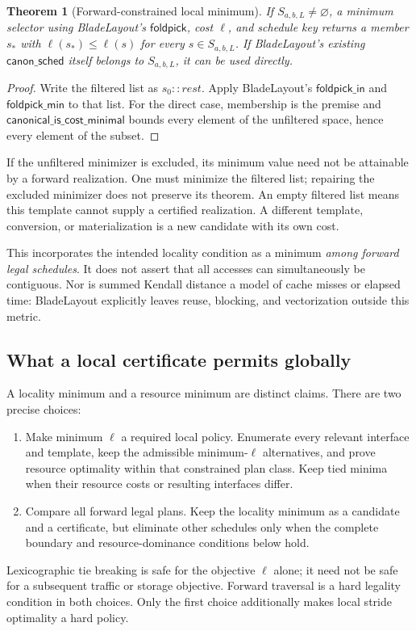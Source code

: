 \documentclass[11pt]{article}
\newtheorem{theorem}{Theorem}
\begin{document}
\begin{theorem}[Forward-constrained local minimum]
If $S_{a,b,L}\ne\varnothing$, a minimum selector using BladeLayout's
$\mathsf{foldpick}$, cost $\ell$, and schedule key returns a member $s_*$ with
$\ell(s_*)\le\ell(s)$ for every $s\in S_{a,b,L}$.
If BladeLayout's existing $\mathsf{canon\_sched}$ itself belongs to $S_{a,b,L}$, it can be used directly.
\end{theorem}
\begin{proof}
Write the filtered list as $s_0::\mathit{rest}$. Apply BladeLayout's
$\mathsf{foldpick\_in}$ and $\mathsf{foldpick\_min}$ to that list. For the direct case, membership is the premise and
$\mathsf{canonical\_is\_cost\_minimal}$ bounds every element of the unfiltered space, hence every element of the subset.
\end{proof}
If the unfiltered minimizer is excluded, its minimum value need not be attainable by a forward realization. One must minimize the filtered list; repairing the excluded minimizer does not preserve its theorem. An empty filtered list means this template cannot supply a certified realization. A different template, conversion, or materialization is a new candidate with its own cost.

This incorporates the intended locality condition as a minimum \emph{among forward legal schedules}. It does not assert that all accesses can simultaneously be contiguous. Nor is summed Kendall distance a model of cache misses or elapsed time: BladeLayout explicitly leaves reuse, blocking, and vectorization outside this metric.

\subsection{What a local certificate permits globally}
A locality minimum and a resource minimum are distinct claims. There are two precise choices:
\begin{enumerate}
\item Make minimum $\ell$ a required local policy. Enumerate every relevant interface and template, keep the admissible minimum-$\ell$ alternatives, and prove resource optimality within that constrained plan class. Keep tied minima when their resource costs or resulting interfaces differ.
\item Compare all forward legal plans. Keep the locality minimum as a candidate and a certificate, but eliminate other schedules only when the complete boundary and resource-dominance conditions below hold.
\end{enumerate}
Lexicographic tie breaking is safe for the objective $\ell$ alone; it need not be safe for a subsequent traffic or storage objective. Forward traversal is a hard legality condition in both choices. Only the first choice additionally makes local stride optimality a hard policy.
\end{document}
